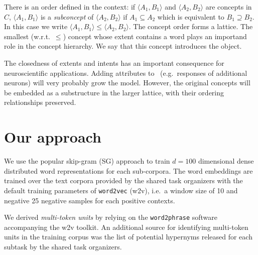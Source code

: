 \documentclass[11pt,a4paper]{article}
\begin{document}
There is an order defined in the context:
if $\langle A_1 , B_1 \rangle$ and $\langle A_2 , B_2 \rangle$ are concepts in
$C$, $\langle A_1 , B_1 \rangle$ is a \emph{subconcept} of $\langle A_2 , B_2
\rangle$ if $A_1 \subseteq A_2 $ which is equivalent to $B_1 \supseteq B_2 $.  In this case
we write $\langle A_1 , B_1 \rangle \le \langle A_2 , B_2 \rangle$.
The concept order forms a %
lattice.
The smallest (w.r.t.~$\le$) concept whose extent contains a word plays an
importand role in the concept hierarchy.  We say that this concept
introduces the object.

The closedness of extents and intents has an important consequence for
neuroscientific applications. Adding attributes to \at~(e.g.~responses of
additional neurons) will very probably grow the model.  However, the original
concepts will be embedded as a substructure in the larger lattice, with their
ordering relationships preserved.

\section{Our approach}

We use the popular skip-gram (SG) %
approach \citep{Mikolov:2013f} to train $d=100$ dimensional dense distributed
word representations for each sub-corpora. The word embeddings are trained over the text corpora provided by the shared task organizers with the default training parameters of \texttt{word2vec} (w2v), i.e.~a window size of 10 and negative 25 negative samples for each positive contexts.

We derived \emph{multi-token units} by relying on the \texttt{word2phrase} software accompanying the w2v toolkit. An additional source for identifying multi-token units in the training corpus was the list of potential hypernyms released for each subtask by the shared task organizers.
\end{document}
